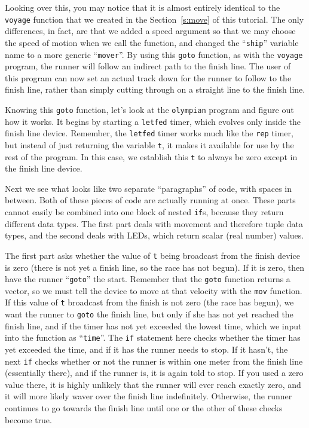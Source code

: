 \documentclass{article}
\newcommand\var[1]{{\tt #1}}
\newcommand\qvar[1]{``{\tt #1}''}
\begin{document}
Looking over this, you may notice that it is almost entirely identical
to the \var{voyage} function that we created in the
Section~\ref{s:move} of this tutorial.  The only differences, in fact,
are that we added a speed argument so that we may choose the speed of
motion when we call the function, and changed the \qvar{ship} variable
name to a more generic \qvar{mover}.  By using this \var{goto}
function, as with the \var{voyage} program, the runner will follow an
indirect path to the finish line.  The user of this program can now
set an actual track down for the runner to follow to the finish line,
rather than simply cutting through on a straight line to the finish
line.

Knowing this \var{goto} function, let's look at the \var{olympian}
program and figure out how it works.  It begins by starting a
\var{letfed} timer, which evolves only inside the finish line device.
Remember, the \var{letfed} timer works much like the \var{rep} timer,
but instead of just returning the variable \var{t}, it makes it
available for use by the rest of the program.  In this case, we
establish this \var{t} to always be zero except in the finish line
device.

Next we see what looks like two separate ``paragraphs'' of code, with
spaces in between.  Both of these pieces of code are actually running
at once.  These parts cannot easily be combined into one block of
nested \var{if}s, because they return different data types.  The first
part deals with movement and therefore tuple data types, and the
second deals with LEDs, which return scalar (real number) values.

The first part asks whether the value of \var{t} being broadcast from
the finish device is zero (there is not yet a finish line, so the race
has not begun).  If it is zero, then have the runner \qvar{goto} the
start.  Remember that the \var{goto} function returns a vector, so we
must tell the device to move at that velocity with the \var{mov}
function.  If this value of \var{t} broadcast from the finish is not
zero (the race has begun), we want the runner to \var{goto} the finish
line, but only if she has not yet reached the finish line, and if the
timer has not yet exceeded the lowest time, which we input into the
function as \qvar{time}.  The \var{if} statement here checks whether
the timer has yet exceeded the time, and if it has the runner needs to stop.
If it hasn't, the next \var{if} checks whether or not the runner is
within one meter from the finish line (essentially there), and if the
runner is, it is again told to stop.  If you used a zero value there,
it is highly unlikely that the runner will ever reach exactly zero,
and it will more likely waver over the finish line indefinitely.
Otherwise, the runner continues to go towards the finish line until
one or the other of these checks become true.
\end{document}
